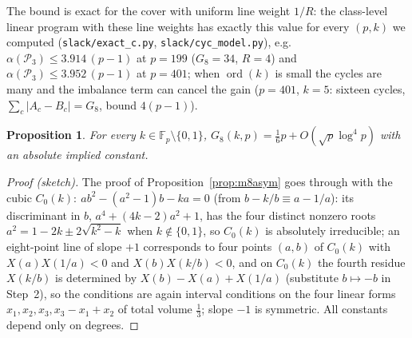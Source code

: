 \documentclass[11pt]{article}
\newtheorem{proposition}[theorem]{Proposition}
\theoremstyle{remark}
\newcommand{\Fp}{\mathbb{F}_p}
\newcommand{\Pset}{\mathcal{P}}
\begin{document}
The bound is exact for the cover with uniform line weight $1/R$: the class-level linear program with these line weights has exactly this
value for every $(p,k)$ we computed (\texttt{slack/exact\_c.py}, \texttt{slack/cyc\_model.py}), e.g.\ $\alpha(\Pset_3)\le3.914\,(p-1)$ at $p=199$
($G_8=34$, $R=4$) and $\alpha(\Pset_3)\le3.952\,(p-1)$ at $p=401$; when $\operatorname{ord}(k)$ is small the cycles are many and the
imbalance term can cancel the gain ($p=401$, $k=5$: sixteen cycles, $\sum_c|A_c-B_c|=G_8$, bound $4(p-1)$).

\begin{proposition}\label{prop:g8k}
For every $k\in\Fp\setminus\{0,1\}$, $G_8(k,p)=\tfrac16p+O(\sqrt p\log^4p)$ with an absolute implied constant.
\end{proposition}
\begin{proof}[Proof (sketch)]
The proof of Proposition~\ref{prop:m8asym} goes through with the cubic $C_0(k):\ ab^2-(a^2-1)b-ka=0$ (from $b-k/b\equiv a-1/a$): its
discriminant in $b$, $a^4+(4k-2)a^2+1$, has the four distinct nonzero roots $a^2=1-2k\pm2\sqrt{k^2-k}$ when $k\notin\{0,1\}$, so $C_0(k)$ is
absolutely irreducible; an eight-point line of slope $+1$ corresponds to four points $(a,b)$ of $C_0(k)$ with $X(a)X(1/a)<0$ and
$X(b)X(k/b)<0$, and on $C_0(k)$ the fourth residue $X(k/b)$ is determined by $X(b)-X(a)+X(1/a)$ (substitute $b\mapsto-b$ in Step~2), so the
conditions are again interval conditions on the four linear forms $x_1,x_2,x_3,x_3-x_1+x_2$ of total volume $\frac13$; slope $-1$ is
symmetric.  All constants depend only on degrees.
\end{proof}
\end{document}

